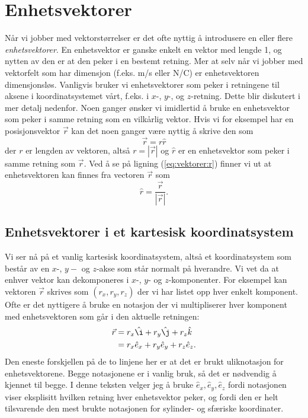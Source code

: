 \documentclass[a4paper,norsk,12pt]{book}
\def\ex{\ensuremath{\hat{e}_x}}
\def\ey{\ensuremath{\hat{e}_y}}
\def\ez{\ensuremath{\hat{e}_z}}
\begin{document}
\section{Enhetsvektorer}
Når vi jobber med vektorstørrelser er det ofte nyttig å introdusere en eller flere \emph{enhetsvektorer}. En enhetsvektor er ganske enkelt en vektor med lengde 1, og nytten av den er at den peker i en bestemt retning. Mer at selv når vi jobber med vektorfelt som har dimensjon (f.eks. m/s eller N/C) er enhetsvektoren dimensjonsløs. Vanligvis bruker vi enhetsvektorer som peker i retningene til aksene i koordinatsystemet vårt, f.eks. i $x$-, $y$-, og $z$-retning. Dette blir diskutert i mer detalj nedenfor. Noen ganger ønsker vi imidlertid å bruke en enhetsvektor som peker i samme retning som en vilkårlig vektor. Hvis vi for eksempel har en posisjonsvektor $\vec{r}$ kan det noen ganger være nyttig å skrive den som 
\begin{equation}
	\vec{r} = r \hat{r}
	\label{eq:vektorer:r}
\end{equation}
der $r$ er lengden av vektoren, altså $r = |\vec{r}|$ og $\hat{r}$ er en enhetsvektor som peker i samme retning som $\vec{r}$. Ved å se på ligning (\ref{eq:vektorer:r}) finner vi ut at enhetsvektoren kan finnes fra vectoren $\vec{r}$ som
\begin{displaymath}
	\hat{r} = \frac{\vec{r}}{|\vec{r}|}.
\end{displaymath}

\subsection{Enhetsvektorer i et kartesisk koordinatsystem}
Vi ser nå på et vanlig kartesisk koordinatsystem, altså et koordinatsystem som består av en $x$-, $y-$ og $z$-akse som står normalt på hverandre. Vi vet da at enhver vektor kan dekomponeres i $x$-, $y$- og $z$-komponenter. For eksempel kan vektoren $\vec{r}$ skrives som $(r_x, r_y, r_z)$ der vi har listet opp hver enkelt komponent. Ofte er det nyttigere å bruke en notasjon der vi multipliserer hver komponent med enhetsvektoren som går i den aktuelle retningen:
\begin{displaymath}
\begin{aligned}
	\vec{r} &= r_x\hat{\i} + r_y\hat{\j} + r_z\hat{k} \\
	&= r_x\ex + r_y\ey + r_z\ez.
\end{aligned}
\end{displaymath}
Den eneste forskjellen på de to linjene her er at det er brukt uliknotasjon for enhetsvektorene. Begge notasjonene er i vanlig bruk, så det er nødvendig å kjennet til begge. I denne teksten velger jeg å bruke $\ex, \ey, \ez$ fordi notasjonen viser eksplisitt hvilken retning hver enhetsvektor peker, og fordi den er helt tilsvarende den mest brukte notasjonen for sylinder- og sfæriske koordinater.
\end{document}
